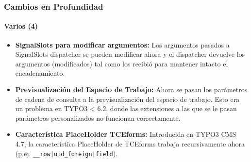 \begin{frame}[fragile]
	\frametitle{Cambios en Profundidad}
	\framesubtitle{Varios (4)}

	\begin{itemize}

		\item \textbf{SignalSlots para modificar argumentos:}\newline
			\small
				Los argumentos pasados a SignalSlots dispatcher se pueden modificar ahora y el dispatcher devuelve los argumentos (modificados) tal como los recibió para mantener intacto el encadenamiento.
			\normalsize

		\item \textbf{Previsualización del Espacio de Trabajo:}\newline
			\small
				Ahora se pasan los parámetros de cadena de consulta a la previsualización del espacio de trabajo. Esto era un problema en TYPO3 < 6.2, donde las extensiones a las que se le pasan parámetros personalizados no funcionan correctamente.
			\normalsize

		\item \textbf{Característica PlaceHolder TCEforms:}\newline
			\small
				Introducida en TYPO3 CMS 4.7, la característica PlaceHolder de TCEforms trabaja recursivamente ahora (p.ej. \texttt{\_\_row|uid\_foreign|field}).
			\normalsize
	\end{itemize}

\end{frame}


